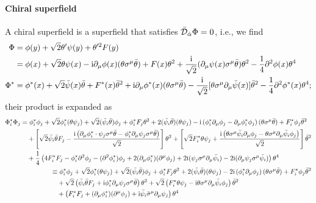 \documentclass[CheatSheet]{subfiles}
\begin{document}
\paragraph{Chiral superfield} A chiral superfield is a superfield that satisfies $\bar {\mathcal D}_{\dot\alpha} \Phi = 0$, i.e.,
we find
\begin{align}
 \Phi
 &= \phi(y) + \sqrt{2} \theta' \psi(y) + \theta'^2 F(y)\\
 &= \phi(x)+\sqrt{2} \theta \psi(x)-{\mathrm{i}} \partial_{\mu}\phi(x) (\theta \sigma^{\mu}\bar\theta)+F(x) \theta^2+\frac{{\mathrm{i}}}{\sqrt{2}} (\partial_{\mu}\psi(x)\sigma^{\mu}\bar\theta) \theta^2-\frac{1}{4} \partial^2\phi(x) \theta^4
\\
 \Phi^*
 &= \phi^*(x)+\sqrt{2} \bar{\psi}(x)\bar\theta+F^*(x) \bar\theta^2+{\mathrm{i}} \partial_{\mu}\phi^*(x) (\theta \sigma^{\mu}\bar\theta)-\frac{{\mathrm{i}}}{\sqrt{2}}[\theta \sigma^{\mu}\partial_{\mu}\bar{\psi}(x)] \bar\theta^2-\frac{1}{4} \partial^2\phi^*(x) \theta^4;
\end{align}
their product is expanded as
\begin{align}
\begin{split}
 \Phi_i^* \Phi_j
 &=
 \phi_i^*\phi_j + \sqrt{2} \phi_i^*(\theta \psi_j)+\sqrt{2} (\bar{\psi_i}\bar\theta)\phi_j
 + \phi_i^* F_j \theta^2+2 (\bar{\psi_i}\bar\theta)(\theta \psi_j)
 -{\mathrm{i}} \left(\phi_i^*\partial_{\mu}\phi_j-\partial_{\mu}\phi_i^*\phi_j\right) (\theta \sigma^{\mu}\bar\theta)
 +F_i^*\phi_j \bar\theta^2
 \\&\quad
+\left[
\sqrt{2} \bar{\psi_i}\bar\theta F_j-\frac{{\mathrm{i}}\left( \partial_{\mu}\phi_i^*\cdot\psi_j\sigma^{\mu}\bar\theta-\phi_i^*\partial_{\mu}\psi_j\sigma^{\mu}\bar\theta\right)}{\sqrt2}\right]\theta^2
+\left[\sqrt2 F_i^*\theta \psi_j+\frac{{\mathrm{i}}\left(\theta \sigma^{\mu}\bar{\psi_i}\partial_{\mu}\phi_j-\theta \sigma^{\mu}\partial_{\mu}\bar{\psi_i}\phi_j\right)}{\sqrt2}\right] \bar\theta^2
\\&\quad
+\frac{1}{4} \left(4 F_i^*F_j-\phi_i^*\partial^2\phi_j-(\partial^2\phi_i^*)\phi_j+2 (\partial_{\mu}\phi_i^*)(\partial^{\mu}\phi_j)+2 {\mathrm{i}} (\psi_j\sigma^{\mu}\partial_{\mu}\bar{\psi_i})-2 {\mathrm{i}} (\partial_{\mu}\psi_j\sigma^{\mu}\bar{\psi_i})\right) \theta^4
\end{split}
\\
\begin{split}
 &\equiv
 \phi_i^*\phi_j + \sqrt{2} \phi_i^*(\theta \psi_j)+\sqrt{2} (\bar{\psi_i}\bar\theta)\phi_j
 + \phi_i^* F_j \theta^2+2 (\bar{\psi_i}\bar\theta)(\theta \psi_j)
 -2{\mathrm{i}} \left(\phi_i^*\partial_{\mu}\phi_j\right) (\theta \sigma^{\mu}\bar\theta)
 +F_i^*\phi_j \bar\theta^2
 \\&\quad
+\sqrt2\left(
\bar{\psi_i}\bar\theta F_j+{\mathrm{i}}\phi_i^*\partial_{\mu}\psi_j\sigma^{\mu}\bar\theta\right)\theta^2
+\sqrt2\left(F_i^*\theta \psi_j-{\mathrm{i}}\theta \sigma^{\mu}\partial_{\mu}\bar{\psi_i}\phi_j\right) \bar\theta^2
\\&\quad
+\left(F_i^*F_j+(\partial_{\mu}\phi_i^*)(\partial^{\mu}\phi_j)+{\mathrm{i}}\bar{\psi_i}\bar\sigma^\mu\partial_{\mu}\psi_j\right) \theta^4
\end{split}
\end{align}
\end{document}

